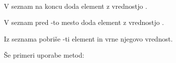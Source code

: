\documentclass[letterpaper,10pt,english]{sphinxmanual}
\begin{document}
\begin{fulllineitems}
\label{skripta/podatkovni_tipi:list}~

\begin{fulllineitems}
\label{skripta/podatkovni_tipi:list.append}
V seznam na koncu doda element z vrednostjo .

\end{fulllineitems}


\begin{fulllineitems}
\label{skripta/podatkovni_tipi:list.insert}
V seznam pred -to mesto doda element z vrednostjo .

\end{fulllineitems}


\begin{fulllineitems}
\label{skripta/podatkovni_tipi:list.pop}
Iz seznama pobriše -ti element in vrne njegovo vrednost.

\end{fulllineitems}


\end{fulllineitems}


Še primeri uporabe metod:
\end{document}
